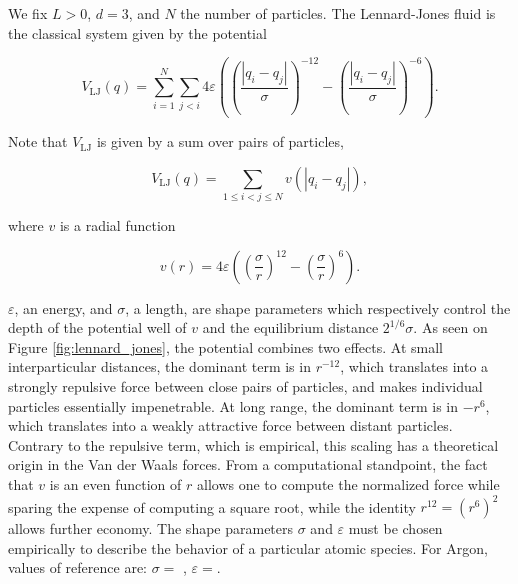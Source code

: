  \begin{example}
    We fix $L>0$, $d=3$, and $N$ the number of particles. The Lennard-Jones fluid is the classical system given by the potential

    \begin{equation}
        \label{Lennard-Jones potential}
        V_{\mathrm{LJ}}(q)=\sum_{i=1}^N\sum_{j<i} 4\varepsilon \left( \left(\frac{|q_i-q_j|}{\sigma}\right)^{-12} - \left(\frac{|q_i-q_j|}{\sigma}\right)^{-6} \right).        
    \end{equation}
     
    Note that $V_{\mathrm{LJ}}$ is given by a sum over pairs of particles,

    $$V_{\mathrm{LJ}}(q)=\sum_{1\leq i < j \leq N} v(|q_i-q_j|),$$

    where $v$ is a radial function

    $$v(r)=4\varepsilon \left( \left( \frac{\sigma}{r}\right)^{12}-\left(\frac{\sigma}{r} \right)^6\right).$$

    $\varepsilon$, an energy, and $\sigma$, a length, are shape parameters which respectively control the depth of the potential well of $v$ and the equilibrium distance $2^{1/6}\sigma$.
    As seen on Figure \ref{fig:lennard_jones}, the potential combines two effects. At small interparticular distances, the dominant term is in $r^{-12}$, which translates into a strongly repulsive force between close pairs of particles, and makes individual particles essentially impenetrable.
    At long range, the dominant term is in $-r^6$, which translates into a weakly attractive force between distant particles. Contrary to the repulsive term, which is empirical, this scaling has a theoretical origin in the Van der Waals forces.
    From a computational standpoint, the fact that $v$ is an even function of $r$ allows one to compute the normalized force while sparing the expense of computing a square root, while the identity $r^{12}=(r^6)^2$ allows further economy.
    The shape parameters $\sigma$ and $\varepsilon$ must be chosen empirically to describe the behavior of a particular atomic species. For Argon, values of reference are: $\sigma=$ , $\varepsilon=$.
 \end{example}


